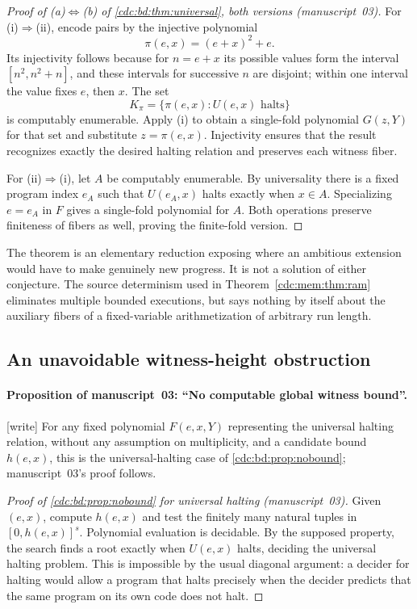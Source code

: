 \documentclass[11pt,a4paper]{article}
\theoremstyle{definition}
\theoremstyle{remark}
\newcommand{\wtag}{\textup{[write]}}%
\begin{document}
\begin{proof}[Proof of (a)$\Leftrightarrow$(b) of \cref{cdc:bd:thm:universal}, both versions (manuscript~03)]
For (i)$\Rightarrow$(ii), encode pairs by the injective polynomial
\[
 \pi(e,x)=(e+x)^2+e.
\]
Its injectivity follows because for $n=e+x$ its possible values form the interval
$[n^2,n^2+n]$, and these intervals for successive $n$ are disjoint; within one
interval the value fixes $e$, then $x$. The set
\[
 K_\pi=\{\pi(e,x): U(e,x)\text{ halts}\}
\]
is computably enumerable. Apply (i) to obtain a single-fold polynomial
$G(z,Y)$ for that set and substitute $z=\pi(e,x)$. Injectivity ensures that the
result recognizes exactly the desired halting relation and preserves each
witness fiber.

For (ii)$\Rightarrow$(i), let $A$ be computably enumerable. By universality
there is a fixed program index $e_A$ such that $U(e_A,x)$ halts exactly when
$x\in A$. Specializing $e=e_A$ in $F$ gives a single-fold polynomial for $A$.
Both operations preserve finiteness of fibers as well, proving the finite-fold
version.
\end{proof}

The theorem is an elementary reduction exposing where an ambitious extension
would have to make genuinely new progress. It is not a solution of either
conjecture. The source determinism used in Theorem~\ref{cdc:mem:thm:ram} eliminates
multiple bounded executions, but says nothing by itself about the auxiliary
fibers of a fixed-variable arithmetization of arbitrary run length.

\subsection{An unavoidable witness-height obstruction}

\paragraph{Proposition of manuscript~03: ``No computable global witness bound''.} \wtag{} For any fixed polynomial $F(e,x,Y)$ representing the universal halting relation, without any assumption on multiplicity, and a candidate bound $h(e,x)$, this is the universal-halting case of \cref{cdc:bd:prop:nobound}; manuscript~03's proof follows.

\begin{proof}[Proof of \cref{cdc:bd:prop:nobound} for universal halting (manuscript~03)]
Given $(e,x)$, compute $h(e,x)$ and test the finitely many natural tuples in
$[0,h(e,x)]^s$. Polynomial evaluation is decidable. By the supposed property,
the search finds a root exactly when $U(e,x)$ halts, deciding the universal
halting problem. This is impossible by the usual diagonal argument: a decider
for halting would allow a program that halts precisely when the decider predicts
that the same program on its own code does not halt.
\end{proof}
\end{document}
